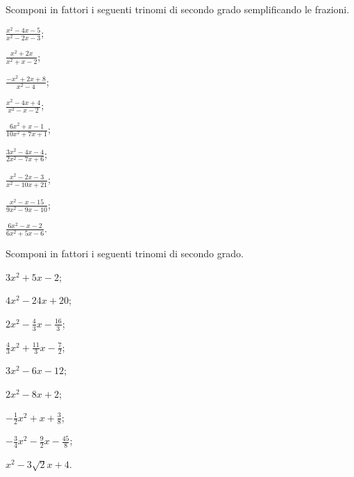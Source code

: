 
\begin{esercizio}[\Ast]
 \label{ese:3.95} %
Scomponi in fattori i seguenti trinomi di secondo grado semplificando le frazioni.
\begin{multicols}{3}
\begin{enumeratea}
\item $\frac{x^{2}-4x-5}{x^{2}-2x-3}$;
\item $\frac{x^{2}+2x}{x^{2}+x-2}$;
\item $\frac{-x^{2}+2x+8}{x^{2}-4}$;
\item $\frac{x^{2}-4x+4}{x^{2}-x-2}$;
\item $\frac{6x^{2}+x-1}{10x^{2}+7x+1}$;
\item $\frac{3x^{2}-4x-4}{2x^{2}-7x+6}$;
\item $\frac{x^{2}-2x-3}{x^{2}-10x+21}$;
\item $\frac{x^{2}-x-15}{9x^{2}-9x-10}$;
\item $\frac{6x^{2}-x-2}{6x^{2}+5x-6}$.
\end{enumeratea}
\end{multicols}
\end{esercizio}

\begin{esercizio}[\Ast]
 \label{ese:3.96}
Scomponi in fattori i seguenti trinomi di secondo grado.
\begin{multicols}{3}
\begin{enumeratea}
\item $3 x^{2} + 5 x - 2$;
\item $4 x^{2}-24 x + 20$;
\item $2 x^{2}-\frac{4}{3} x - \frac{16}{3}$;
\item $\frac{4}{3} x^{2} + \frac{11}{3} x - \frac{7}{2}$;
\item $3 x^{2}-6 x-12$;
\item $2 x^{2}-8 x + 2$;
\item $- \frac{1}{2} x^{2} + x + \frac{3}{8}$;
\item $- \frac{3}{4} x^{2}-\frac{9}{2} x - \frac{45}{8}$;
\item $x^{2}-3\sqrt{2} x +4$.
\end{enumeratea}
\end{multicols}
\end{esercizio}

